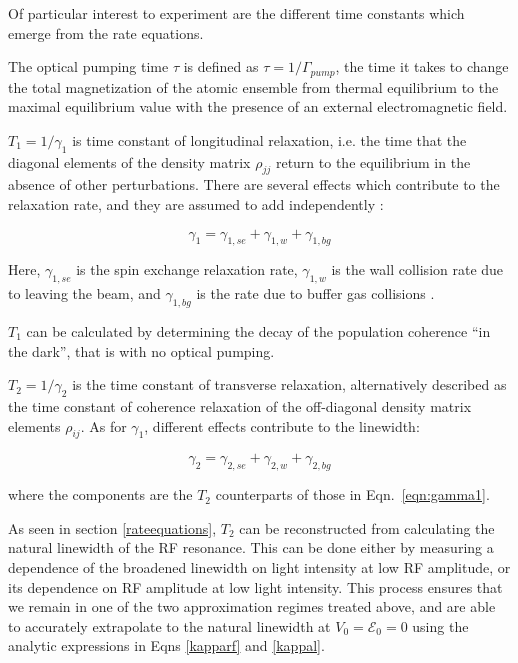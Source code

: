 Of particular interest to experiment are the different time constants
which emerge from the rate equations. 

The optical pumping time $\tau$ is defined as $\tau =
1/\Gamma_{pump}$, the time it takes to change the total magnetization
of the atomic ensemble from thermal equilibrium to the maximal
equilibrium value with the presence of an external electromagnetic
field. 

$T_1 = 1/\gamma_1$ is time constant of longitudinal relaxation,
i.e. the time that the diagonal elements of the density matrix
$\rho_{jj}$ return to the equilibrium in the absence of other
perturbations. There are several effects which contribute to the
relaxation rate, and they are assumed to add independently
\cite{vanier}:

\begin{equation}
\gamma_1 = \gamma_{1,se} + \gamma_{1,w} + \gamma_{1,bg} 
\label{eqn:gamma1}
\end{equation}

Here, $\gamma_{1,se}$ is the spin exchange relaxation rate,
$\gamma_{1,w}$ is the wall collision rate due to leaving the beam, and
$\gamma_{1,bg}$ is the rate due to buffer gas collisions
\cite{vanier}.

$T_1$ can be calculated by determining the decay of the population
coherence ``in the dark'', that is with no optical pumping.

$T_2 = 1/\gamma_2$ is the time constant of transverse relaxation,
alternatively described as the time constant of coherence relaxation
of the off-diagonal density matrix elements $\rho_{ij}$. As for
$\gamma_1$, different effects contribute to the linewidth:

\begin{equation}
\gamma_2 = \gamma_{2,se} + \gamma_{2,w} + \gamma_{2,bg} 
\label{eqn:gamma2}
\end{equation} 
 
where the components are the $T_2$ counterparts of those in
Eqn.~\ref{eqn:gamma1}.

As seen in section \ref{rateequations}, $T_2$ can be reconstructed
from calculating the natural linewidth of the RF resonance. This can
be done either by measuring a dependence of the broadened linewidth on
light intensity at low RF amplitude, or its dependence on RF amplitude
at low light intensity. This process ensures that we remain in one of
the two approximation regimes treated above, and are able to accurately
extrapolate to the natural linewidth at $V_0 = \mathcal{E}_0 = 0$ using the analytic expressions in Eqns \ref{kapparf} and \ref{kappal}.

